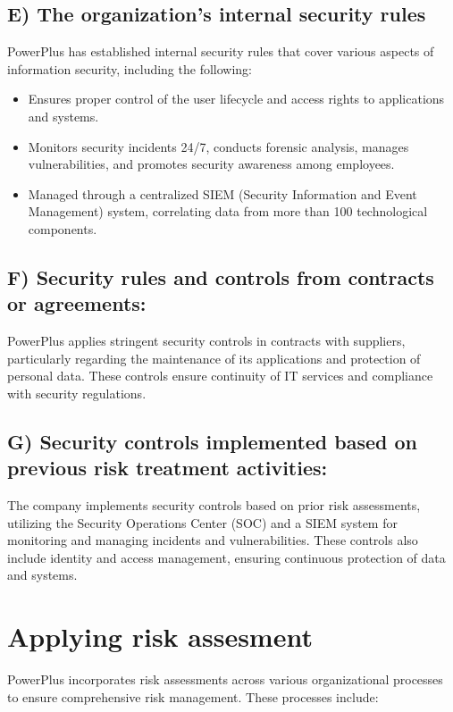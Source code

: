 \subsection*{E) The organization's internal security rules}
PowerPlus has established internal security rules that cover various aspects of information security, including the following:

\begin{itemize}
    \item Ensures proper control of the user lifecycle and access rights to applications and systems.
    \item  Monitors security incidents 24/7, conducts forensic analysis, manages vulnerabilities, and promotes security awareness among employees.
    \item  Managed through a centralized SIEM (Security Information and Event Management) system, correlating data from more than 100 technological components.
\end{itemize}

\subsection*{F) Security rules and controls from contracts or agreements:}
PowerPlus applies stringent security controls in contracts with suppliers, particularly regarding the maintenance of its applications and protection of personal data. These controls ensure continuity of IT services and compliance with security regulations.

\subsection*{G) Security controls implemented based on previous risk treatment activities:}
The company implements security controls based on prior risk assessments, utilizing the Security Operations Center (SOC) and a SIEM system for monitoring and managing incidents and vulnerabilities. These controls also include identity and access management, ensuring continuous protection of data and systems.


\section{Applying risk assesment}

PowerPlus incorporates risk assessments across various organizational processes to ensure comprehensive risk management. These processes include:

